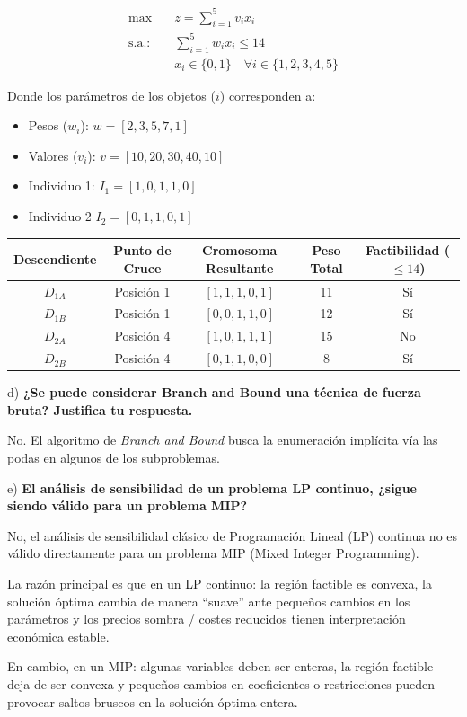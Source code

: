 \begin{align}
\max \quad & z = \sum_{i=1}^{5} v_i x_i \\
\text{s.a.:} \quad 
& \sum_{i=1}^{5} w_i x_i \le 14 \\
& x_i \in \{0,1\} \quad \forall i \in \{1,2,3,4,5\}
\end{align}

Donde los parámetros de los objetos ($i$) corresponden a:
\begin{itemize}
    \item Pesos ($w_i$): $w = [2, 3, 5, 7, 1]$
    \item Valores ($v_i$): $v = [10, 20, 30, 40, 10]$
\end{itemize}

\begin{itemize}
    \item Individuo 1: $I_1 = [1, 0, 1, 1, 0]$
    \item Individuo 2 $I_2 = [0, 1, 1, 0, 1]$
    
\end{itemize}

\begin{center}
    

\begin{tabular}{ccccc}
\toprule
Descendiente & Punto de Cruce & Cromosoma Resultante & Peso Total & Factibilidad ($\le 14$) \\
\midrule
$D_{1A}$ & Posición 1 & $[1, 1, 1, 0, 1]$ & 11 & Sí \\
$D_{1B}$ & Posición 1 & $[0, 0, 1, 1, 0]$ & 12 & Sí \\
$D_{2A}$ & Posición 4 & $[1, 0, 1, 1, 1]$ & 15 & No  \\
$D_{2B}$ & Posición 4 & $[0, 1, 1, 0, 0]$ & 8  & Sí \\
\bottomrule
\end{tabular}
\end{center}

d) \textbf{¿Se puede considerar Branch and Bound una técnica de fuerza bruta? Justifica tu respuesta.}

No. El algoritmo de \textit{Branch and Bound} busca la enumeración implícita vía las podas en algunos de los subproblemas.


e) \textbf{El análisis de sensibilidad de un problema LP continuo, ¿sigue siendo válido para un problema MIP?}

No, el análisis de sensibilidad clásico de Programación Lineal (LP) continua no es válido directamente para un problema MIP (Mixed Integer Programming).

La razón principal es que en un LP continuo: la región factible es convexa, la solución óptima cambia de manera “suave” ante pequeños cambios en los parámetros y los precios sombra / costes reducidos tienen interpretación económica estable.

En cambio, en un MIP: algunas variables deben ser enteras, la región factible deja de ser convexa y pequeños cambios en coeficientes o restricciones pueden provocar saltos bruscos en la solución óptima entera.
